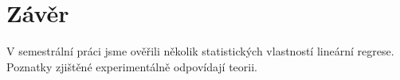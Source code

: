 \section{Závěr}

V semestrální práci jsme ověřili několik statistických vlastností lineární regrese.
Poznatky zjištěné experimentálně odpovídají teorii.
